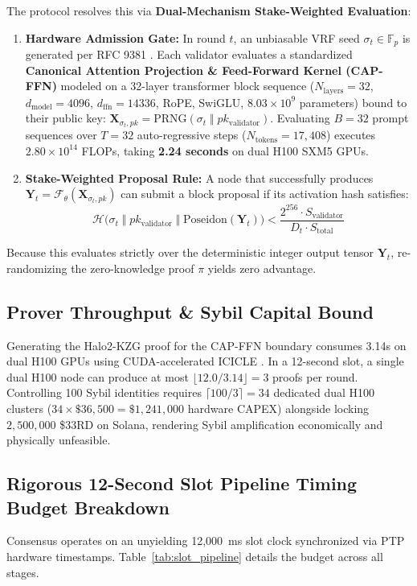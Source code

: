 \documentclass[10pt,twocolumn,letterpaper]{article}
\begin{document}
The protocol resolves this via \textbf{Dual-Mechanism Stake-Weighted Evaluation}:
\begin{enumerate}
    \item \textbf{Hardware Admission Gate:} In round $t$, an unbiasable VRF seed $\sigma_t \in \mathbb{F}_p$ is generated per RFC 9381 \cite{goldberg2023vrf}. Each validator evaluates a standardized \textbf{Canonical Attention Projection \& Feed-Forward Kernel (CAP-FFN)} modeled on a 32-layer transformer block sequence ($N_{\text{layers}} = 32$, $d_{\text{model}} = 4096$, $d_{\text{ffn}} = 14336$, RoPE, SwiGLU, $8.03 \times 10^9$ parameters) bound to their public key: $\mathbf{X}_{\sigma_t, pk} = \text{PRNG}(\sigma_t \;\Vert\; pk_{\text{validator}})$. Evaluating $B = 32$ prompt sequences over $T = 32$ auto-regressive steps ($N_{\text{tokens}} = 17{,}408$) executes $2.80 \times 10^{14}$ FLOPs, taking \textbf{2.24 seconds} on dual H100 SXM5 GPUs.
    \item \textbf{Stake-Weighted Proposal Rule:} A node that successfully produces $\mathbf{Y}_t = \mathcal{F}_\theta(\mathbf{X}_{\sigma_t, pk})$ can submit a block proposal if its activation hash satisfies:
    \begin{equation}
    \mathcal{H}\Big(\sigma_t \;\Vert\; pk_{\text{validator}} \;\Vert\; \text{Poseidon}(\mathbf{Y}_t)\Big) < \frac{2^{256} \cdot S_{\text{validator}}}{D_t \cdot S_{\text{total}}}
    \end{equation}
\end{enumerate}
Because this evaluates strictly over the deterministic integer output tensor $\mathbf{Y}_t$, re-randomizing the zero-knowledge proof $\pi$ yields zero advantage.

\subsection{Prover Throughput \& Sybil Capital Bound}
Generating the Halo2-KZG proof for the CAP-FFN boundary consumes 3.14s on dual H100 GPUs using CUDA-accelerated ICICLE \cite{icicle2024}. In a 12-second slot, a single dual H100 node can produce at most $\lfloor 12.0 / 3.14 \rfloor = 3$ proofs per round. Controlling 100 Sybil identities requires $\lceil 100 / 3 \rceil = 34$ dedicated dual H100 clusters ($34 \times \$36,500 = \$1,241,000$ hardware CAPEX) alongside locking $2,500,000$ \$33RD on Solana, rendering Sybil amplification economically and physically unfeasible.

\subsection{Rigorous 12-Second Slot Pipeline Timing Budget Breakdown}
Consensus operates on an unyielding 12,000~ms slot clock synchronized via PTP hardware timestamps. Table~\ref{tab:slot_pipeline} details the budget across all stages.
\end{document}
